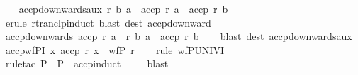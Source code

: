 \begin{isabellebody}
\isanewline
\ \ \isamarkupfalse%
\isanewline
{}\isamarkupfalse%
%
\endisatagproof
{\isafoldproof}%
%
\isadelimproof
\isanewline
%
\endisadelimproof
\isanewline
{}\isamarkupfalse%
\ accp{\isacharunderscore}{\kern0pt}downwards{\isacharunderscore}{\kern0pt}aux{\isacharcolon}{\kern0pt}\ {\isachardoublequoteopen}r\isactrlsup {\isacharasterisk}{\kern0pt}\isactrlsup {\isacharasterisk}{\kern0pt}\ b\ a\ {\isasymLongrightarrow}\ accp\ r\ a\ {\isasymlongrightarrow}\ accp\ r\ b{\isachardoublequoteclose}\isanewline
%
\isadelimproof
\ \ %
\endisadelimproof
%
\isatagproof
{}\isamarkupfalse%
\ {\isacharparenleft}{\kern0pt}erule\ rtranclp{\isacharunderscore}{\kern0pt}induct{\isacharparenright}{\kern0pt}\ {\isacharparenleft}{\kern0pt}blast\ dest{\isacharcolon}{\kern0pt}\ accp{\isacharunderscore}{\kern0pt}downward{\isacharparenright}{\kern0pt}{\isacharplus}{\kern0pt}%
\endisatagproof
{\isafoldproof}%
%
\isadelimproof
\isanewline
%
\endisadelimproof
\isanewline
{}\isamarkupfalse%
\ accp{\isacharunderscore}{\kern0pt}downwards{\isacharcolon}{\kern0pt}\ {\isachardoublequoteopen}accp\ r\ a\ {\isasymLongrightarrow}\ r\isactrlsup {\isacharasterisk}{\kern0pt}\isactrlsup {\isacharasterisk}{\kern0pt}\ b\ a\ {\isasymLongrightarrow}\ accp\ r\ b{\isachardoublequoteclose}\isanewline
%
\isadelimproof
\ \ %
\endisadelimproof
%
\isatagproof
{}\isamarkupfalse%
\ {\isacharparenleft}{\kern0pt}blast\ dest{\isacharcolon}{\kern0pt}\ accp{\isacharunderscore}{\kern0pt}downwards{\isacharunderscore}{\kern0pt}aux{\isacharparenright}{\kern0pt}%
\endisatagproof
{\isafoldproof}%
%
\isadelimproof
\isanewline
%
\endisadelimproof
\isanewline
{}\isamarkupfalse%
\ accp{\isacharunderscore}{\kern0pt}wfPI{\isacharcolon}{\kern0pt}\ {\isachardoublequoteopen}{\isasymforall}x{\isachardot}{\kern0pt}\ accp\ r\ x\ {\isasymLongrightarrow}\ wfP\ r{\isachardoublequoteclose}\isanewline
%
\isadelimproof
\ \ %
\endisadelimproof
%
\isatagproof
{}\isamarkupfalse%
\ {\isacharparenleft}{\kern0pt}rule\ wfPUNIVI{\isacharparenright}{\kern0pt}\isanewline
\ \ \isamarkupfalse%
\ {\isacharparenleft}{\kern0pt}rule{\isacharunderscore}{\kern0pt}tac\ P\ {\isacharequal}{\kern0pt}\ P\ \ accp{\isacharunderscore}{\kern0pt}induct{\isacharparenright}{\kern0pt}\isanewline
\ \ \ \isamarkupfalse%
\ blast{\isacharplus}{\kern0pt}\isanewline
\ \ \isamarkupfalse%
%
\endisatagproof
{\isafoldproof}%
%
\isadelimproof
\isanewline
%
\endisadelimproof
\isanewline
{}\isamarkupfalse%

\end{isabellebody}
